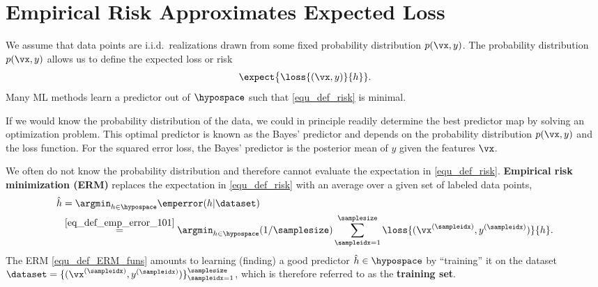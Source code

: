 \documentclass[12pt]{report}
\begin{document}

\section{Empirical Risk Approximates Expected Loss} 
\label{equ_sec_emp_risk_approximates_expected_loss}

We assume that data points are i.i.d.\ realizations drawn from some fixed 
probability distribution $p(\vx,y)$. The probability distribution $p(\vx,y)$ 
allows us to define the expected loss or risk 
$$\label{equ_def_risk} \expect \big \{ \loss{(\vx,y)}{h} \}.$$
Many ML methods learn a predictor out of $\hypospace$ such 
that \eqref{equ_def_risk} is minimal. 

If we would know the probability distribution of the data, we could 
in principle readily determine the best predictor map by solving an 
optimization problem. This optimal predictor is known as the Bayes' 
predictor and depends on the probability distribution $p(\vx,y)$ 
and the loss function. For the squared error loss, the Bayes' 
predictor is the posterior mean of $y$ given the features $\vx$. 

We often do not know the probability distribution and therefore 
cannot evaluate the expectation in \eqref{equ_def_risk}. 
 {\bf Empirical risk minimization (ERM)} replaces the expectation in 
 \eqref{equ_def_risk} with an average over a given set of labeled data points,  
\begin{align}
\label{equ_def_ERM_funs}
   \hat{h} & = \argmin_{h \in \hypospace} \emperror(h|\dataset) \nonumber \\ 
   & \stackrel{\eqref{eq_def_emp_error_101}}{=}  \argmin_{h \in \hypospace} (1/\samplesize) \sum_{\sampleidx=1}^{\samplesize} \loss{(\vx^{(\sampleidx)},y^{(\sampleidx)})}{h}.
\end{align}
The ERM \eqref{equ_def_ERM_funs} amounts to learning (finding) a 
good predictor $\hat{h} \in \hypospace$ by ``training'' it on the 
dataset $\dataset = \{ (\vx^{(\sampleidx)},y^{(\sampleidx)}) \}_{\sampleidx=1}^{\samplesize}$, 
which is therefore referred to as the {\bf training set}. 
\end{document}
